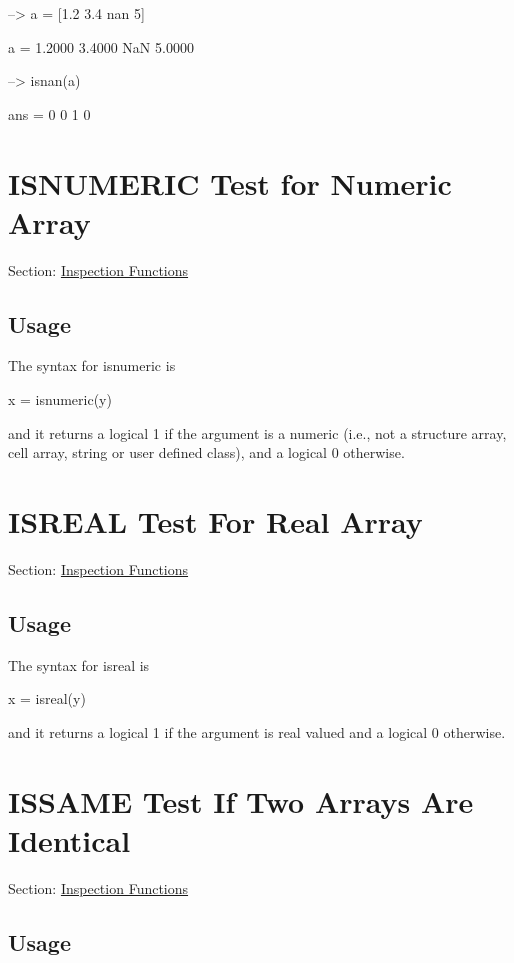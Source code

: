 \begin{DoxyVerbInclude}
--> a = [1.2 3.4 nan 5]

a = 
    1.2000    3.4000 NaN    5.0000 

--> isnan(a)

ans = 
 0 0 1 0 
\end{DoxyVerbInclude}
 \hypertarget{inspection_isnumeric}{}\section{I\-S\-N\-U\-M\-E\-R\-I\-C Test for Numeric Array}\label{inspection_isnumeric}
Section\-: \hyperlink{sec_inspection}{Inspection Functions} \hypertarget{vtkwidgets_vtkxyplotwidget_Usage}{}\subsection{Usage}\label{vtkwidgets_vtkxyplotwidget_Usage}
The syntax for {\ttfamily isnumeric} is \begin{DoxyVerb}  x = isnumeric(y)
\end{DoxyVerb}
 and it returns a logical 1 if the argument is a numeric (i.\-e., not a structure array, cell array, string or user defined class), and a logical 0 otherwise. \hypertarget{inspection_isreal}{}\section{I\-S\-R\-E\-A\-L Test For Real Array}\label{inspection_isreal}
Section\-: \hyperlink{sec_inspection}{Inspection Functions} \hypertarget{vtkwidgets_vtkxyplotwidget_Usage}{}\subsection{Usage}\label{vtkwidgets_vtkxyplotwidget_Usage}
The syntax for {\ttfamily isreal} is \begin{DoxyVerb}   x = isreal(y)
\end{DoxyVerb}
 and it returns a logical 1 if the argument is real valued and a logical 0 otherwise. \hypertarget{inspection_issame}{}\section{I\-S\-S\-A\-M\-E Test If Two Arrays Are Identical}\label{inspection_issame}
Section\-: \hyperlink{sec_inspection}{Inspection Functions} \hypertarget{vtkwidgets_vtkxyplotwidget_Usage}{}\subsection{Usage}\label{vtkwidgets_vtkxyplotwidget_Usage}
